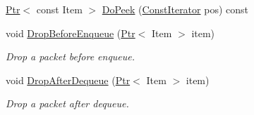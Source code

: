 \begin{DoxyCompactItemize}
\hyperlink{classns3_1_1Ptr}{Ptr}$<$ const Item $>$ \hyperlink{classns3_1_1Queue_add8f532cc43e5bf05c1913682f5f70be}{Do\+Peek} (\hyperlink{classns3_1_1Queue_af108d00696b556f3b3addd8816413119}{Const\+Iterator} pos) const 
\item 
void \hyperlink{classns3_1_1Queue_a232737f5004afcce711481eb8f920abe}{Drop\+Before\+Enqueue} (\hyperlink{classns3_1_1Ptr}{Ptr}$<$ Item $>$ item)
\begin{DoxyCompactList}\small\item\em Drop a packet before enqueue. \end{DoxyCompactList}\item 
void \hyperlink{classns3_1_1Queue_a024df51402e0f5019de723b166d4b714}{Drop\+After\+Dequeue} (\hyperlink{classns3_1_1Ptr}{Ptr}$<$ Item $>$ item)
\begin{DoxyCompactList}\small\item\em Drop a packet after dequeue. \end{DoxyCompactList}\end{DoxyCompactItemize}
